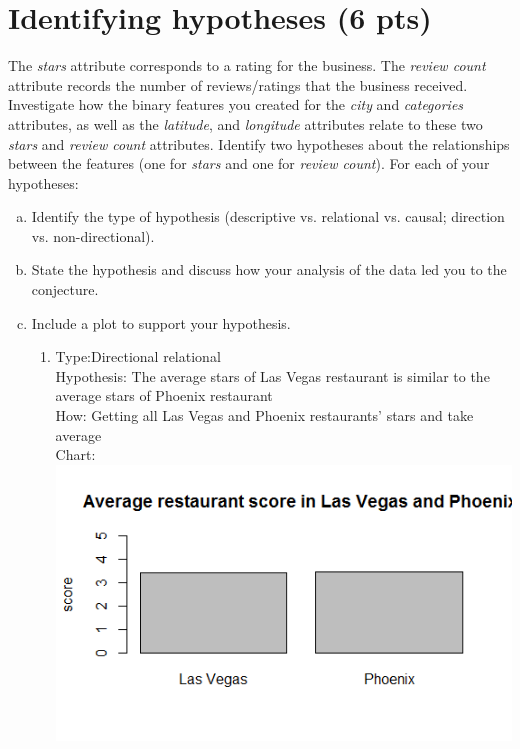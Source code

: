 \documentclass[11pt]{article}
\begin{document}
\section{Identifying hypotheses (6 pts)}

The {\em stars} attribute corresponds to a rating for the business. The {\em review count} attribute records the number of reviews/ratings that the business received. Investigate how the binary features you created for the {\em city} and {\em categories} attributes, as well as the {\em latitude}, and {\em longitude} attributes relate to these two {\em stars} and {\em review count} attributes. Identify two hypotheses about the relationships between the features (one for {\em stars} and one for {\em review count}). For each of your hypotheses:
\begin{enumerate}[(a)]
\item Identify the type of hypothesis (descriptive vs. relational vs. causal; direction vs. non-directional).
\item State the hypothesis and discuss how your analysis of the data led you to the conjecture.
\item Include a plot to support your hypothesis.

\begin{enumerate}
\item
Type:Directional relational\\
Hypothesis: The average stars of Las Vegas restaurant is similar to the average stars of Phoenix restaurant\\
How: Getting all Las Vegas and Phoenix restaurants' stars and take average\\
Chart:\\
\includegraphics[width=5in]{lvphoenix.png}


\end{enumerate}
\end{enumerate}
\end{document}
